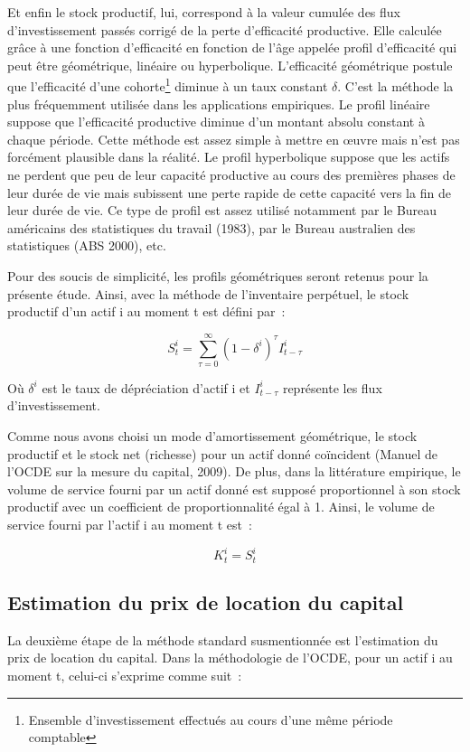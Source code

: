 \documentclass[12pt,a4paper,oneside]{report}
\begin{document}
Et enfin le stock productif, lui, correspond à la valeur cumulée des flux d’investissement passés corrigé de
la perte d’efficacité productive. Elle calculée grâce à une fonction d’efficacité en fonction de l’âge appelée
profil d’efficacité qui peut être géométrique, linéaire ou hyperbolique. L’efficacité géométrique postule que
l’efficacité d’une cohorte\footnote{Ensemble d’investissement effectués au cours d’une même période comptable}
diminue à un taux constant \(\delta \). C’est la méthode la plus fréquemment utilisée dans les applications
empiriques. Le profil linéaire suppose que l’efficacité productive diminue d’un montant absolu constant à
chaque période. Cette méthode est assez simple à mettre en œuvre mais n’est pas forcément plausible dans la
réalité. Le profil hyperbolique suppose que les actifs ne perdent que peu de leur capacité productive au cours
des premières phases de leur durée de vie mais subissent une perte rapide de cette capacité vers la fin de
leur durée de vie. Ce type de profil est assez utilisé notamment par le Bureau américains des statistiques du
travail (1983), par le Bureau australien des statistiques (ABS 2000), etc.

Pour des soucis de simplicité, les profils géométriques seront retenus pour la présente étude. Ainsi, avec la
méthode de l’inventaire perpétuel, le stock productif d’un actif i au moment t est défini par~:

\[
{S}_{t}^{i}=\sum_{\tau =0}^{\infty } {(1-{\delta }^{i})}^{\tau }{I}_{t-\tau }^{i}
\]

Où \({\delta }^{i}\) est le taux de dépréciation d’actif i et \({I}_{t-\tau }^{i}\) représente les flux
d’investissement.

Comme nous avons choisi un mode d’amortissement géométrique, le stock productif et le stock net (richesse)
pour un actif donné coïncident (Manuel de l’OCDE sur la mesure du capital, 2009). De plus, dans la littérature
empirique, le volume de service fourni par un actif donné est supposé proportionnel à son stock productif avec
un coefficient de proportionnalité égal à 1. Ainsi, le volume de service fourni par l’actif i au moment t
est~:

\[
{K}_{t}^{i}={S}_{t}^{i}
\]

\subsection{Estimation du prix de location du capital}

La deuxième étape de la méthode standard susmentionnée est l’estimation du prix de location du capital. Dans
la méthodologie de l’OCDE, pour un actif i au moment t, celui-ci s’exprime comme suit~:
\end{document}
